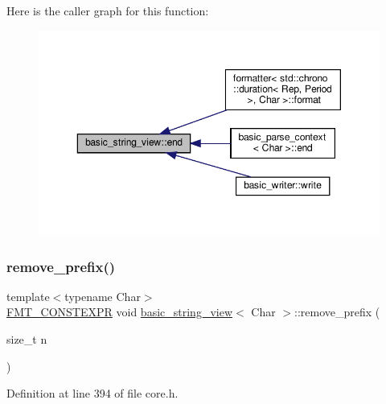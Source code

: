 Here is the caller graph for this function\+:
\nopagebreak
\begin{figure}[H]
\begin{center}
\leavevmode
\includegraphics[width=350pt]{classbasic__string__view_a7d262051736a662df0f35d6e39ebf773_icgraph}
\end{center}
\end{figure}
\mbox{\label{classbasic__string__view_a1da7aa04f8f729b4f846e573cecba499}} 
\subsubsection{\texorpdfstring{remove\+\_\+prefix()}{remove\_prefix()}}
{\footnotesize\ttfamily template$<$typename Char$>$ \\
\hyperlink{core_8h_a69201cb276383873487bf68b4ef8b4cd}{F\+M\+T\+\_\+\+C\+O\+N\+S\+T\+E\+X\+PR} void \hyperlink{classbasic__string__view}{basic\+\_\+string\+\_\+view}$<$ Char $>$\+::remove\+\_\+prefix (\begin{DoxyParamCaption}\item[{size\+\_\+t}]{n }\end{DoxyParamCaption})\hspace{0.3cm}{\ttfamily [inline]}}



Definition at line 394 of file core.\+h.


